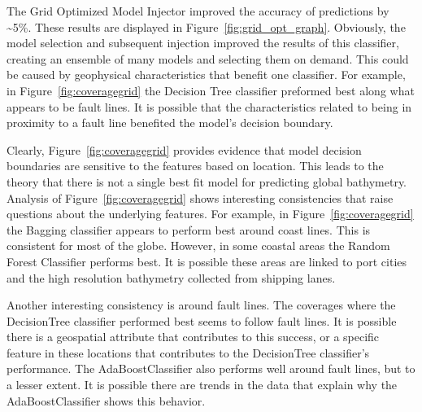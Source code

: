 \par
The Grid Optimized Model Injector improved the accuracy of predictions by \~{}5\%.
These results are displayed in Figure~\ref{fig:grid_opt_graph}.
Obviously, the model selection and subsequent injection improved the results of this classifier, creating an ensemble of many models and selecting them on demand.
This could be caused by geophysical characteristics that benefit one classifier.
For example, in Figure~\ref{fig:coveragegrid} the Decision Tree classifier preformed best along what appears to be fault lines.
It is possible that the characteristics related to being in proximity to a fault line benefited the model's decision boundary. 

\par
Clearly, Figure~\ref{fig:coveragegrid} provides evidence that model decision boundaries are sensitive to the features based on location.
This leads to the theory that there is not a single best fit model for predicting global bathymetry.
Analysis of Figure~\ref{fig:coveragegrid} shows interesting consistencies that raise questions about the underlying features.
For example, in Figure~\ref{fig:coveragegrid} the Bagging classifier appears to perform best around coast lines.
This is consistent for most of the globe.
However, in some coastal areas the Random Forest Classifier performs best. 
It is possible these areas are linked to port cities and the high resolution bathymetry collected from shipping lanes.

\par
Another interesting consistency is around fault lines.
The coverages where the DecisionTree classifier performed best seems to follow fault lines.
It is possible there is a geospatial attribute that contributes to this success, or a specific feature in these locations that contributes to the DecisionTree classifier's performance.
The AdaBoostClassifier also performs well around fault lines, but to a lesser extent.
It is possible there are trends in the data that explain why the AdaBoostClassifier shows this behavior.

